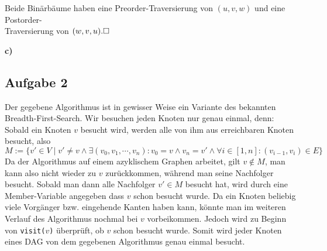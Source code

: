 \documentclass[a4paper,graphics,11pt]{article}
\newcommand{\aufgabe}[1]{\subsection*{Aufgabe #1}}
\begin{document}
Beide Binärbäume haben eine Preorder-Traversierung von $(u, v, w)$ und eine Postorder-\\
Traversierung von $(w, v, u).\hfill\square$

\textbf{c)}


\newpage
\aufgabe{2}
Der gegebene Algorithmus ist in gewisser Weise ein Variante des bekannten Breadth-First-Search.
Wir besuchen jeden Knoten nur genau einmal, denn:\\
Sobald ein Knoten $v$ besucht wird, werden alle von ihm aus erreichbaren Knoten besucht, also
$$
M := \{v' \in V \mid v' \neq v \land \exists (v_0, v_1, \cdots, v_n) : v_0 = v \land v_n = v' \land \forall i \in [1,n] : (v_{i-1}, v_i) \in E\}
$$
Da der Algorithmus auf einem azyklischem Graphen arbeitet, gilt $v \notin M$, man kann also nicht wieder zu $v$
zurückkommen, während man seine Nachfolger besucht. Sobald man dann alle Nachfolger $v' \in M$ besucht hat,
wird durch eine Member-Variable angegeben dass $v$ schon besucht wurde. Da ein Knoten beliebig viele Vorgänger
bzw. eingehende Kanten haben kann, könnte man im weiteren Verlauf des Algorithmus nochmal bei $v$ vorbeikommen.
Jedoch wird zu Beginn von \texttt{visit($v$)} überprüft, ob $v$ schon besucht wurde. Somit wird jeder Knoten eines DAG
von dem gegebenen Algorithmus genau einmal besucht.
\end{document}
